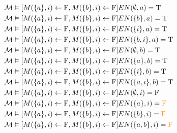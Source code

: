 \begin{frame}
    \begin{align*}
        \mathcal{M} & \vDash[M(\{a\},i)\leftarrow \mathrm{F},M(\{b\},i)\leftarrow \mathrm{F}]EN(\emptyset,a) = \mathrm{T}                         & \\
        \mathcal{M} & \vDash[M(\{a\},i)\leftarrow \mathrm{F},M(\{b\},i)\leftarrow \mathrm{F}]EN(\{b\},a)= \mathrm{T}                       & \\
        \mathcal{M} & \vDash[M(\{a\},i)\leftarrow \mathrm{F},M(\{b\},i)\leftarrow \mathrm{F}]EN(\{i\},a) = \mathrm{T}                      & \\
        \mathcal{M} & \vDash[M(\{a\},i)\leftarrow \mathrm{F},M(\{b\},i)\leftarrow \mathrm{F}]EN(\{b,i\},a)= \mathrm{T}                     & \\
        \mathcal{M} & \vDash[M(\{a\},i)\leftarrow \mathrm{F},M(\{b\},i)\leftarrow \mathrm{F}]EN(\emptyset,b)   = \mathrm{T}                       & \\
        \mathcal{M} & \vDash[M(\{a\},i)\leftarrow \mathrm{F},M(\{b\},i)\leftarrow \mathrm{F}]EN(\{a\},b) = \mathrm{T}                      & \\
        \mathcal{M} & \vDash[M(\{a\},i)\leftarrow \mathrm{F},M(\{b\},i)\leftarrow \mathrm{F}]EN(\{i\},b) = \mathrm{T}                      & \\
        \mathcal{M} & \vDash[M(\{a\},i)\leftarrow \mathrm{F},M(\{b\},i)\leftarrow \mathrm{F}]EN(\{a,i\},b) = \mathrm{T}                    & \\
        \mathcal{M} & \vDash[M(\{a\},i)\leftarrow \mathrm{F},M(\{b\},i)\leftarrow \mathrm{F}]EN(\emptyset,i) = \mathrm{F}                         & \\
        \mathcal{M} & \vDash[M(\{a\},i)\leftarrow \mathrm{F},M(\{b\},i)\leftarrow \mathrm{F}]EN(\{a\},i) = \textcolor{orange}{\mathrm{F}}  & \\
        \mathcal{M} & \vDash[M(\{a\},i)\leftarrow \mathrm{F},M(\{b\},i)\leftarrow \mathrm{F}]EN(\{b\},i)  = \textcolor{orange}{\mathrm{F}} & \\
        \mathcal{M} & \vDash[M(\{a\},i)\leftarrow \mathrm{F},M(\{b\},i)\leftarrow \mathrm{F}]EN(\{a,b\},i)= \textcolor{orange}{\mathrm{F}} & \\
    \end{align*}
\end{frame}

